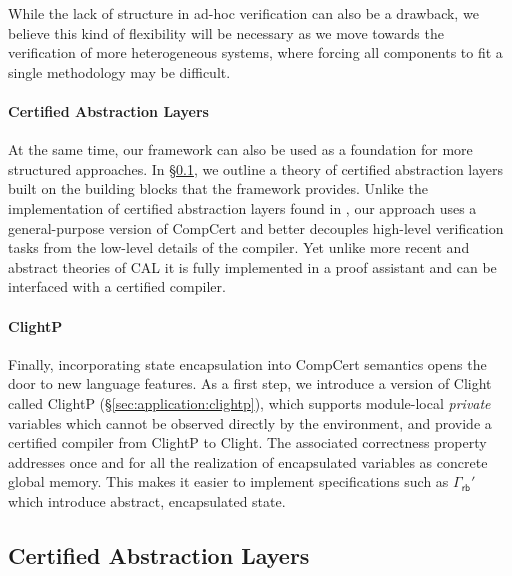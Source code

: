 \documentclass[acmsmall,screen,review,anonymous]{acmart}
\newcommand{\kw}[1]{\ensuremath{ \mathsf{#1} }}
\begin{document}
While the lack of structure in ad-hoc verification
can also be a drawback,
we believe this kind of flexibility will be necessary
as we move towards the verification of more heterogeneous systems,
where forcing all components to fit a single methodology may be difficult.


\paragraph{Certified Abstraction Layers} %

At the same time,
our framework can also be used as a foundation
for more structured approaches.
In \S\ref{sec:application:cal},
we outline a theory of certified abstraction layers
built on the building blocks that the framework provides.
Unlike
the implementation of certified abstraction layers
found in \citet{popl15},
our approach uses a general-purpose version of CompCert
and better decouples high-level verification tasks
from the low-level details of the compiler.
Yet unlike more recent and abstract theories of CAL
\citep{rbgs-cal,popl22}
it is fully implemented in a proof assistant
and can be interfaced with a certified compiler.


\paragraph{ClightP} \label{sec:overview:clightp} %

Finally,
incorporating state encapsulation
into CompCert semantics
opens the door to new language features.
As a first step,
we introduce a version of Clight called ClightP
(\S\ref{sec:application:clightp}),
which supports module-local \emph{private} variables
which cannot be observed directly by the environment,
and provide a certified compiler from ClightP to Clight.
The associated correctness property
addresses once and for all
the realization of encapsulated variables
as concrete global memory.
This makes it easier to implement specifications such as
$\Gamma_\kw{rb}'$ which introduce abstract, encapsulated state.




\subsection{Certified Abstraction Layers} \label{sec:application:cal} %
\end{document}
